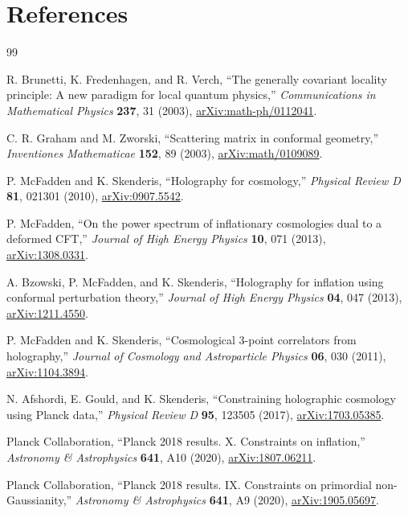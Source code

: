 \documentclass[11pt]{article}
\numberwithin{equation}{section}
\begin{document}
\section{References}
\begin{thebibliography}{99}

R. Brunetti, K. Fredenhagen, and R. Verch,
``The generally covariant locality principle: A new paradigm for local quantum physics,''
\emph{Communications in Mathematical Physics} \textbf{237}, 31 (2003),
\href{https://arxiv.org/abs/math-ph/0112041}{arXiv:math-ph/0112041}.

C. R. Graham and M. Zworski,
``Scattering matrix in conformal geometry,''
\emph{Inventiones Mathematicae} \textbf{152}, 89 (2003),
\href{https://arxiv.org/abs/math/0109089}{arXiv:math/0109089}.

P. McFadden and K. Skenderis,
``Holography for cosmology,''
\emph{Physical Review D} \textbf{81}, 021301 (2010),
\href{https://arxiv.org/abs/0907.5542}{arXiv:0907.5542}.

P. McFadden,
``On the power spectrum of inflationary cosmologies dual to a deformed CFT,''
\emph{Journal of High Energy Physics} \textbf{10}, 071 (2013),
\href{https://arxiv.org/abs/1308.0331}{arXiv:1308.0331}.

A. Bzowski, P. McFadden, and K. Skenderis,
``Holography for inflation using conformal perturbation theory,''
\emph{Journal of High Energy Physics} \textbf{04}, 047 (2013),
\href{https://arxiv.org/abs/1211.4550}{arXiv:1211.4550}.

P. McFadden and K. Skenderis,
``Cosmological 3-point correlators from holography,''
\emph{Journal of Cosmology and Astroparticle Physics} \textbf{06}, 030 (2011),
\href{https://arxiv.org/abs/1104.3894}{arXiv:1104.3894}.

N. Afshordi, E. Gould, and K. Skenderis,
``Constraining holographic cosmology using Planck data,''
\emph{Physical Review D} \textbf{95}, 123505 (2017),
\href{https://arxiv.org/abs/1703.05385}{arXiv:1703.05385}.

Planck Collaboration,
``Planck 2018 results. X. Constraints on inflation,''
\emph{Astronomy \& Astrophysics} \textbf{641}, A10 (2020),
\href{https://arxiv.org/abs/1807.06211}{arXiv:1807.06211}.

Planck Collaboration,
``Planck 2018 results. IX. Constraints on primordial non-Gaussianity,''
\emph{Astronomy \& Astrophysics} \textbf{641}, A9 (2020),
\href{https://arxiv.org/abs/1905.05697}{arXiv:1905.05697}.


\end{thebibliography}
\end{document}
